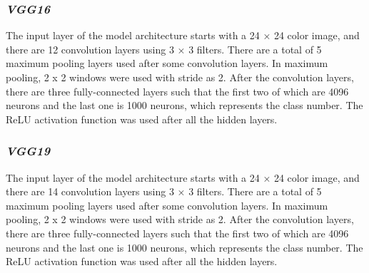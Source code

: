 \subsubsection*{\textit{VGG16}}

The input layer of the model architecture starts with a 24 × 24 color image, and there are 12 convolution layers using 3 × 3 filters. There are a total of 5 maximum pooling layers used after some convolution layers. In maximum pooling, 2 x 2 windows were used with stride as 2. After the convolution layers, there are three fully-connected layers such that the first two of which are 4096 neurons and the last one is 1000 neurons, which represents the class number. The ReLU activation function was used after all the hidden layers.

\subsubsection*{\textit{VGG19}}

The input layer of the model architecture starts with a 24 × 24 color image, and there are 14 convolution layers using 3 × 3 filters. There are a total of 5 maximum pooling layers used after some convolution layers. In maximum pooling, 2 x 2 windows were used with stride as 2. After the convolution layers, there are three fully-connected layers such that the first two of which are 4096 neurons and the last one is 1000 neurons, which represents the class number. The ReLU activation function was used after all the hidden layers.